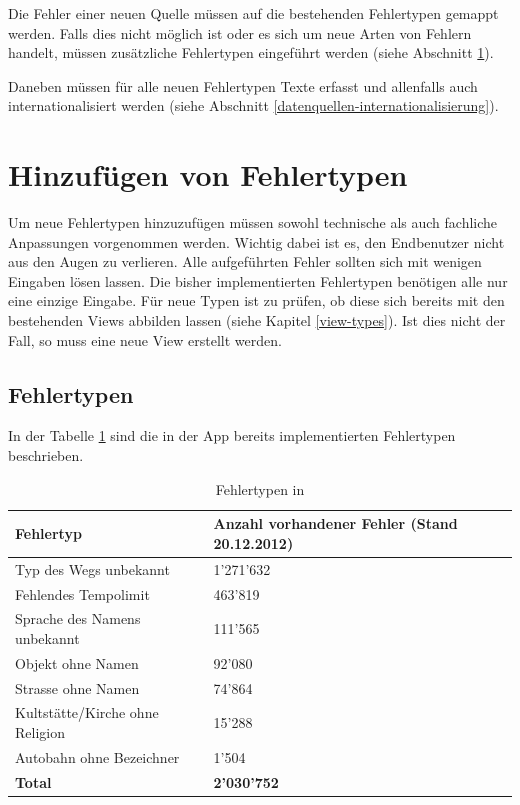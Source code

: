 Die Fehler einer neuen Quelle müssen auf die bestehenden Fehlertypen gemappt werden.
Falls dies nicht möglich ist oder es sich um neue Arten von Fehlern handelt, müssen zusätzliche Fehlertypen eingeführt werden (siehe Abschnitt \ref{additional-error-type}).

Daneben müssen für alle neuen Fehlertypen Texte erfasst und allenfalls auch internationalisiert werden (siehe Abschnitt \ref{datenquellen-internationalisierung}).

\section{Hinzufügen von Fehlertypen}
\label{additional-error-type}
Um neue Fehlertypen hinzuzufügen müssen sowohl technische als auch fachliche Anpassungen vorgenommen werden.
Wichtig dabei ist es, den Endbenutzer nicht aus den Augen zu verlieren.
Alle aufgeführten Fehler sollten sich mit wenigen Eingaben lösen lassen.
Die bisher implementierten Fehlertypen benötigen alle nur eine einzige Eingabe.
Für neue Typen ist zu prüfen, ob diese sich bereits mit den bestehenden Views abbilden lassen (siehe Kapitel \ref{view-types}).
Ist dies nicht der Fall, so muss eine neue View erstellt werden.

\subsection{Fehlertypen}
In der Tabelle \ref{kort-bug-types-table} sind die in der App bereits implementierten Fehlertypen beschrieben.

\begin{table}[H]
\centering
\begin{tabular}{|p{0.40\twocelltabwidth}|p{0.37\twocelltabwidth}|}
\hline
\textbf{Fehlertyp} & \textbf{Anzahl vorhandener Fehler \newline \small{(Stand 20.12.2012)}} \\
\hline
Typ des Wegs unbekannt & 1'271'632 \\
\hline
Fehlendes Tempolimit & 463'819 \\
\hline
Sprache des Namens unbekannt & 111'565 \\
\hline
Objekt ohne Namen & 92'080 \\
\hline
Strasse ohne Namen & 74'864 \\
\hline
Kultstätte/Kirche ohne Religion & 15'288 \\
\hline
Autobahn ohne Bezeichner & 1'504 \\
\hline
\hline
\textbf{Total} & \textbf{2'030'752} \\
\hline
\end{tabular}
\caption{Fehlertypen in \kort{}}
\label{kort-bug-types-table}
\end{table}

